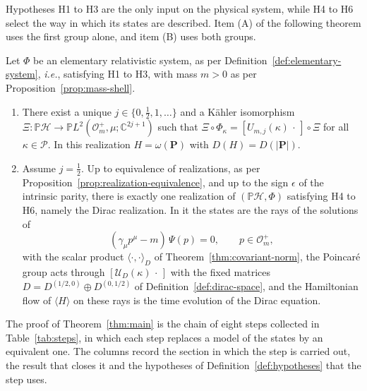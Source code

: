 Hypotheses H1 to H3 are the only input on the physical system, while H4 to H6 select the way in which its states are described. Item (A) of the following theorem uses the first group alone, and item (B) uses both groups.

\begin{theorem}\label{thm:main}
	Let $\Phi$ be an elementary relativistic system, as per Definition~\ref{def:elementary-system}, \textit{i.e.}, satisfying H1 to H3, with mass $m>0$ as per Proposition~\ref{prop:mass-shell}.
	\begin{enumerate}
		\item[\textbf{(A)}] There exist a unique $j\in\{0,\tfrac12,1,\dots\}$ and a Kähler isomorphism $\Xi:\mathbb{P}\mathcal{H}\to\mathbb{P}L^2(\mathcal{O}_m^+,\mu;\mathbb{C}^{2j+1})$ such that $\Xi\circ\Phi_\kappa=[U_{m,j}(\kappa)\,\cdot\,]\circ\Xi$ for all $\kappa\in\mathcal{P}$. In this realization $H=\omega(\mathbf{P})$ with $D(H)=D(|\mathbf{P}|)$.
		\item[\textbf{(B)}] Assume $j=\tfrac12$. Up to equivalence of realizations, as per Proposition~\ref{prop:realization-equivalence}, and up to the sign $\epsilon$ of the intrinsic parity, there is exactly one realization of $(\mathbb{P}\mathcal{H},\Phi)$ satisfying H4 to H6, namely the Dirac realization. In it the states are the rays of the solutions of
		\begin{equation*}
			(\gamma_\mu p^\mu-m)\,\Psi(p)=0, \qquad p\in\mathcal{O}_m^+,
		\end{equation*}
		with the scalar product $\langle\cdot,\cdot\rangle_D$ of Theorem~\ref{thm:covariant-norm}, the Poincar\'e group acts through $[\mathcal{U}_D(\kappa)\,\cdot\,]$ with the fixed matrices $D=D^{(1/2,0)}\oplus D^{(0,1/2)}$ of Definition~\ref{def:dirac-space}, and the Hamiltonian flow of $\langle H\rangle$ on these rays is the time evolution of the Dirac equation.
	\end{enumerate}
\end{theorem}

The proof of Theorem~\ref{thm:main} is the chain of eight steps collected in Table~\ref{tab:steps}, in which each step replaces a model of the states by an equivalent one. The columns record the section in which the step is carried out, the result that closes it and the hypotheses of Definition~\ref{def:hypotheses} that the step uses.

